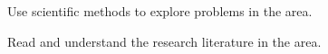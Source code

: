 \item Use scientific methods to explore problems in the area.
\item Read and understand the research literature in the area.
